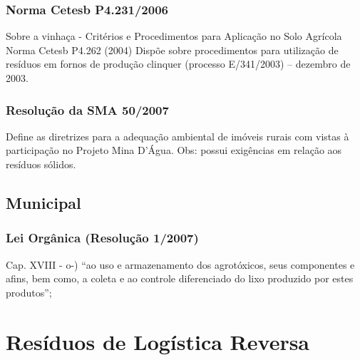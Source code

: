 \begin{subapend}
\begin{subsubapend}
		\subsubsection{Norma Cetesb P4.231/2006}
		Sobre a vinhaça - Critérios e Procedimentos para Aplicação no Solo Agrícola Norma Cetesb P4.262 (2004) Dispõe sobre procedimentos para utilização de resíduos em fornos de produção clinquer (processo E/341/2003) – dezembro de 2003.
		\subsubsection{Resolução da SMA 50/2007}
		Define as diretrizes para a adequação ambiental de imóveis rurais com vistas à participação no Projeto Mina D’Água. Obs: possui exigências em relação aos resíduos sólidos.
	\end{subsubapend}
\end{subapend}

\begin{subapend}
\subsection{Municipal}	
	\begin{subsubapend}
		\subsubsection{Lei Orgânica (Resolução 1/2007)}
		Cap. XVIII - o-) “ao uso e armazenamento dos agrotóxicos, seus componentes e afins, bem como, a coleta e ao controle diferenciado do lixo produzido por estes produtos”;   
	\end{subsubapend}
\end{subapend}

\section{Resíduos de Logística Reversa}

